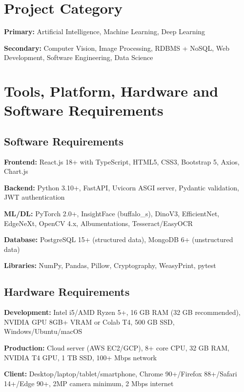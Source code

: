 \documentclass[12pt,a4paper]{article}
\begin{document}
\newpage

\section{Project Category}

\textbf{Primary:} Artificial Intelligence, Machine Learning, Deep Learning

\textbf{Secondary:} Computer Vision, Image Processing, RDBMS + NoSQL, Web Development, Software Engineering, Data Science

\section{Tools, Platform, Hardware and Software Requirements}

\subsection{Software Requirements}

\textbf{Frontend:} React.js 18+ with TypeScript, HTML5, CSS3, Bootstrap 5, Axios, Chart.js

\textbf{Backend:} Python 3.10+, FastAPI, Uvicorn ASGI server, Pydantic validation, JWT authentication

\textbf{ML/DL:} PyTorch 2.0+, InsightFace (buffalo\_s), DinoV3, EfficientNet, EdgeNeXt, OpenCV 4.x, Albumentations, Tesseract/EasyOCR

\textbf{Database:} PostgreSQL 15+ (structured data), MongoDB 6+ (unstructured data)

\textbf{Libraries:} NumPy, Pandas, Pillow, Cryptography, WeasyPrint, pytest

\subsection{Hardware Requirements}

\textbf{Development:} Intel i5/AMD Ryzen 5+, 16 GB RAM (32 GB recommended), NVIDIA GPU 8GB+ VRAM or Colab T4, 500 GB SSD, Windows/Ubuntu/macOS

\textbf{Production:} Cloud server (AWS EC2/GCP), 8+ core CPU, 32 GB RAM, NVIDIA T4 GPU, 1 TB SSD, 100+ Mbps network

\textbf{Client:} Desktop/laptop/tablet/smartphone, Chrome 90+/Firefox 88+/Safari 14+/Edge 90+, 2MP camera minimum, 2 Mbps internet

\newpage
\end{document}
